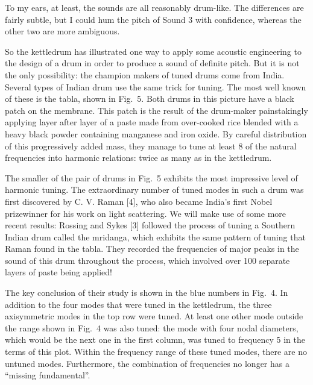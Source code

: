 \audio{}

\audio{}

\audio{}

  To my ears, at least, the sounds are all reasonably drum-like. The 
  differences are fairly subtle, but I could hum the pitch of Sound 3 with 
  confidence, whereas the other two are more ambiguous. 

  So the kettledrum has illustrated one way to apply some acoustic engineering 
  to the design of a drum in order to produce a sound of definite pitch. But it 
  is not the only possibility: the champion makers of tuned drums come from 
  India. Several types of Indian drum use the same trick for tuning. The most 
  well known of these is the tabla, shown in Fig.\ 5. Both drums in this 
  picture have a black patch on the membrane. This patch is the result of the 
  drum-maker painstakingly applying layer after layer of a paste made from 
  over-cooked rice blended with a heavy black powder containing manganese and 
  iron oxide. By careful distribution of this progressively added mass, they 
  manage to tune at least 8 of the natural frequencies into harmonic relations: 
  twice as many as in the kettledrum. 


  The smaller of the pair of drums in Fig.\ 5 exhibits the most impressive 
  level of harmonic tuning. The extraordinary number of tuned modes in such a 
  drum was first discovered by C. V. Raman [4], who also became India's first 
  Nobel prizewinner for his work on light scattering. We will make use of some 
  more recent results: Rossing and Sykes [3] followed the process of tuning a 
  Southern Indian drum called the mridanga, which exhibits the same pattern of 
  tuning that Raman found in the tabla. They recorded the frequencies of major 
  peaks in the sound of this drum throughout the process, which involved over 
  100 separate layers of paste being applied! 

  The key conclusion of their study is shown in the blue numbers in Fig.\ 4. In 
  addition to the four modes that were tuned in the kettledrum, the three 
  axisymmetric modes in the top row were tuned. At least one other mode outside 
  the range shown in Fig.\ 4 was also tuned: the mode with four nodal 
  diameters, which would be the next one in the first column, was tuned to 
  frequency 5 in the terms of this plot. Within the frequency range of these 
  tuned modes, there are no untuned modes. Furthermore, the combination of 
  frequencies no longer has a ``missing fundamental''. 

